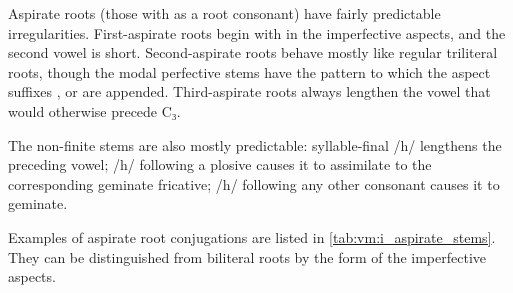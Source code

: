 \documentclass[grammar]{subfiles}
\begin{document}
Aspirate roots (those with  as a root consonant) have fairly predictable
irregularities.  First-aspirate roots begin with  in the imperfective
aspects, and the second vowel is short.  Second-aspirate roots behave mostly like
regular triliteral roots, though the modal perfective stems have the pattern
 to which the aspect suffixes ,  or  are appended.
Third-aspirate roots always lengthen the vowel that would otherwise precede C₃.  

The non-finite stems are also mostly predictable: syllable-final /h/ lengthens the
preceding vowel; /h/ following a plosive causes it to assimilate to the
corresponding geminate fricative; /h/ following any other consonant causes it
to geminate. 

Examples of aspirate root conjugations are listed in
\cref{tab:vm:i_aspirate_stems}.  They can be distinguished from biliteral roots
by the form of the imperfective aspects. 
\end{document}
